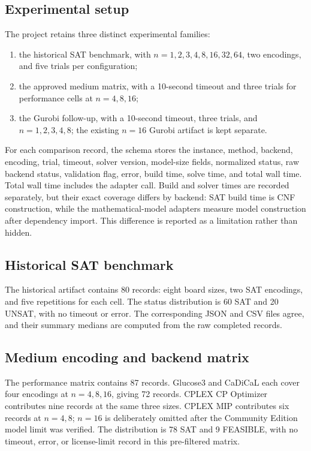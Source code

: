 \documentclass[a4paper,fleqn]{cas-sc}
\begin{document}
\subsection{Experimental setup}
The project retains three distinct experimental families:

\begin{enumerate}
  \item the historical SAT benchmark, with $n=1,2,3,4,8,16,32,64$, two
        encodings, and five trials per configuration;
  \item the approved medium matrix, with a 10-second timeout and three trials
        for performance cells at $n=4,8,16$;
  \item the Gurobi follow-up, with a 10-second timeout, three trials, and
        $n=1,2,3,4,8$; the existing $n=16$ Gurobi artifact is kept separate.
\end{enumerate}

For each comparison record, the schema stores the instance, method, backend,
encoding, trial, timeout, solver version, model-size fields, normalized
status, raw backend status, validation flag, error, build time, solve time,
and total wall time. Total wall time includes the adapter call. Build and
solver times are recorded separately, but their exact coverage differs by
backend: SAT build time is CNF construction, while the mathematical-model
adapters measure model construction after dependency import. This difference
is reported as a limitation rather than hidden.

\subsection{Historical SAT benchmark}
The historical artifact contains 80 records: eight board sizes, two SAT
encodings, and five repetitions for each cell. The status distribution is 60
SAT and 20 UNSAT, with no timeout or error. The corresponding JSON and CSV
files agree, and their summary medians are computed from the raw completed
records.

\subsection{Medium encoding and backend matrix}
The performance matrix contains 87 records. Glucose3 and CaDiCaL each cover
four encodings at $n=4,8,16$, giving 72 records. CPLEX CP Optimizer contributes
nine records at the same three sizes. CPLEX MIP contributes six records at
$n=4,8$; $n=16$ is deliberately omitted after the Community Edition model
limit was verified. The distribution is 78 SAT and 9 FEASIBLE, with no
timeout, error, or license-limit record in this pre-filtered matrix.
\end{document}
